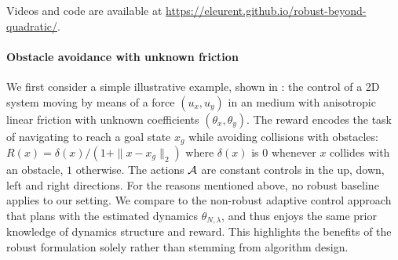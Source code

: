 \documentclass{article}
\begin{document}
Videos and code are available at \url{https://eleurent.github.io/robust-beyond-quadratic/}.

\paragraph{Obstacle avoidance with unknown friction}
We first consider a simple illustrative example, shown in : the control of a 2D system %
moving by means of a force $(u_x, u_y)$ in an medium with anisotropic linear friction with unknown coefficients $(\theta_x, \theta_y)$.
The reward encodes the task of navigating to reach a goal state $x_g$ while avoiding collisions with obstacles: $R(x) = \delta(x)/(1 + \|x - x_g\|_2)$  where $\delta(x)$ is $0$ whenever $x$ collides with an obstacle, $1$ otherwise. The actions $\mathcal{A}$ are constant controls in the up, down, left and right directions.
For the reasons mentioned above, no robust baseline applies to our setting. We compare  to the non-robust adaptive control approach that plans with the estimated dynamics $\theta_{N,\lambda}$, and thus enjoys the same prior knowledge of dynamics structure and reward. This highlights the benefits of the robust formulation solely rather than stemming from algorithm design.
\end{document}
